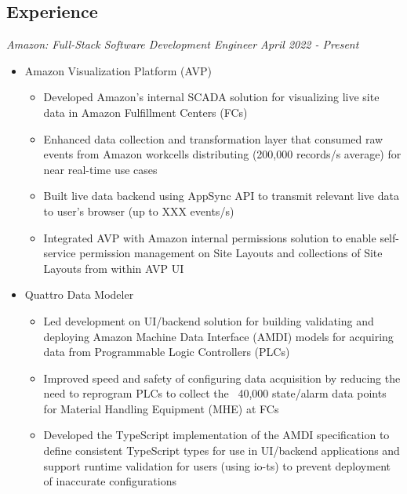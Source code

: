 \documentclass[line,overlapped]{res}
\begin{document}
\setlength\itemsep{.25em}
\address{Email: kllinzy1@gmail.com}
\address{Mobile: (918)440-3563}

\begin{resume}
  \section{Experience}
   {\sl Amazon: Full-Stack Software Development Engineer \hfill April 2022 - \sl Present}
  \begin{itemize}[leftmargin=*]
    \item[] Amazon Visualization Platform (AVP) 
      \begin{itemize}
        \setlength\itemsep{.1em}
        \item Developed Amazon's internal SCADA solution for visualizing live site data in Amazon Fulfillment Centers (FCs) 
        \item Enhanced data collection and transformation layer that consumed raw events from Amazon workcells distributing (200,000 records/s average) for near real-time use cases
        \item  Built live data backend using AppSync API to transmit relevant live data to user's browser (up to XXX events/s)
        \item Integrated AVP with Amazon internal permissions solution  to enable self-service permission management on Site Layouts and collections of Site Layouts from within AVP UI
      \end{itemize}
    \item[] Quattro Data Modeler
      \begin{itemize}
        \setlength\itemsep{.1em}
        \item Led development on UI/backend solution for building validating and deploying Amazon Machine Data Interface (AMDI) models for acquiring data from Programmable Logic Controllers (PLCs)
        \item Improved speed and safety of configuring data acquisition by reducing the need to reprogram PLCs to collect the ~40,000 state/alarm data points for Material Handling Equipment (MHE) at FCs 
        \item Developed the TypeScript implementation of the AMDI specification to define consistent TypeScript types for use in UI/backend applications and support runtime validation for users (using io-ts) to prevent deployment of inaccurate configurations
      \end{itemize}
  \end{itemize}


\end{resume}
\end{document}
